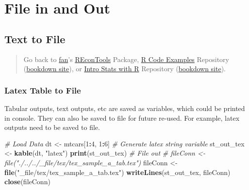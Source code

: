 \documentclass[
]{book}
\newenvironment{Shaded}{\begin{snugshade}}{\end{snugshade}}
\newcommand{\CommentTok}[1]{\textcolor[rgb]{0.56,0.35,0.01}{\textit{#1}}}
\newcommand{\DecValTok}[1]{\textcolor[rgb]{0.00,0.00,0.81}{#1}}
\newcommand{\KeywordTok}[1]{\textcolor[rgb]{0.13,0.29,0.53}{\textbf{#1}}}
\newcommand{\NormalTok}[1]{#1}
\newcommand{\OperatorTok}[1]{\textcolor[rgb]{0.81,0.36,0.00}{\textbf{#1}}}
\newcommand{\StringTok}[1]{\textcolor[rgb]{0.31,0.60,0.02}{#1}}
\begin{document}
\hypertarget{file-in-and-out}{%
\section{File in and Out}\label{file-in-and-out}}

\hypertarget{text-to-file}{%
\subsection{Text to File}\label{text-to-file}}

\begin{quote}
Go back to \href{http://fanwangecon.github.io/}{fan}'s \href{https://fanwangecon.github.io/REconTools/}{REconTools} Package, \href{https://fanwangecon.github.io/R4Econ/}{R Code Examples} Repository (\href{https://fanwangecon.github.io/R4Econ/bookdown}{bookdown site}), or \href{https://fanwangecon.github.io/Stat4Econ/}{Intro Stats with R} Repository (\href{https://fanwangecon.github.io/Stat4Econ/bookdown}{bookdown site}).
\end{quote}

\hypertarget{latex-table-to-file}{%
\subsubsection{Latex Table to File}\label{latex-table-to-file}}

Tabular outputs, text outputs, etc are saved as variables, which could be printed in console. They can also be saved to file for future re-used. For example, latex outputs need to be saved to file.

\begin{Shaded}
\begin{Highlighting}[]
\CommentTok{\# Load Data}
\NormalTok{dt \textless{}{-}}\StringTok{ }\NormalTok{mtcars[}\DecValTok{1}\OperatorTok{:}\DecValTok{4}\NormalTok{, }\DecValTok{1}\OperatorTok{:}\DecValTok{6}\NormalTok{]}
\CommentTok{\# Generate latex string variable}
\NormalTok{st\_out\_tex \textless{}{-}}\StringTok{ }\KeywordTok{kable}\NormalTok{(dt, }\StringTok{"latex"}\NormalTok{)}
\KeywordTok{print}\NormalTok{(st\_out\_tex)}
\CommentTok{\# File out}
\CommentTok{\# fileConn \textless{}{-} file("./../../\_file/tex/tex\_sample\_a\_tab.tex")}
\NormalTok{fileConn \textless{}{-}}\StringTok{ }\KeywordTok{file}\NormalTok{(}\StringTok{"\_file/tex/tex\_sample\_a\_tab.tex"}\NormalTok{)}
\KeywordTok{writeLines}\NormalTok{(st\_out\_tex, fileConn)}
\KeywordTok{close}\NormalTok{(fileConn)}
\end{Highlighting}
\end{Shaded}
\end{document}

